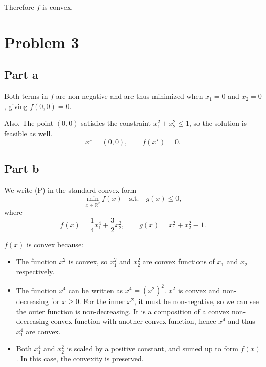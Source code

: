 \documentclass{article}
\begin{document}
    \medskip
    \noindent Therefore $f$ is convex.

    \section{Problem 3}
    \subsection{Part a}

    Both terms in $f$ are non-negative and are thus minimized when $x_1 = 0$ and $x_2 = 0$, giving $f(0,0) = 0$.
    
    \medskip
    \noindent Also, The point $(0,0)$ satisfies the constraint $x_1^2 + x_2^2 \le 1$, so the solution is feasible as well.
    \[ x^\star = (0,0), \qquad f(x^\star) = 0. \]

    \subsection{Part b}

    We write (P) in the standard convex form
    \[
        \min_{x \in \mathbb{R}^2} f(x)
        \quad \text{s.t.} \quad g(x) \le 0,
    \]
    where
    \[
        f(x) = \frac{1}{4}x_1^4 + \frac{3}{2}x_2^2,
        \qquad
        g(x) = x_1^2 + x_2^2 - 1.
    \]

    \noindent $f(x)$ is convex because:
    \begin{itemize}
        \item The function $x^2$ is convex, so $x_1^2$ and $x_2^2$ are convex functions of $x_1$ and $x_2$ respectively.
        \item The function $x^4$ can be written as $x^4 = (x^2)^2$. $x^2$ is convex and non-decreasing for $x \ge 0$. For the inner $x^2$, it must be non-negative, so we can see the outer function is non-decreasing. It is a composition of a convex non-decreasing convex function with another convex function, hence $x^4$ and thus $x_1^4$ are convex.
        \item Both $x_1^4$ and $x_2^2$ is scaled by a positive constant, and sumed up to form $f(x)$. In this case, the convexity is preserved.
    \end{itemize}
    
    \newpage
\end{document}

